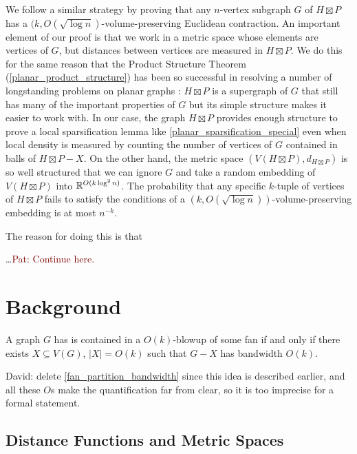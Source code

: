 \documentclass{patmorin}
\newcommand{\david}[1]{{\color{orange} David: #1}}
\newcommand{\pat}[1]{\textcolor{Maroon}{Pat: #1}}
\begin{document}
We follow a similar strategy by proving that any $n$-vertex subgraph $G$ of $H\boxtimes P$ has a $(k,O(\sqrt{\log n})$-volume-preserving Euclidean contraction.  An important element of our proof is that we work in a metric space whose elements are vertices of $G$, but distances between vertices are measured in $H\boxtimes P$.  We do this for the same reason that the Product Structure Theorem (\cref{planar_product_structure}) has been so successful in resolving a number of longstanding problems on planar graphs \cite{dujmovic.joret.ea:planar,EJM23,DEJWW20,DEGJMM21}:  $H\boxtimes P$ is a supergraph of $G$ that still has many of the important properties of $G$ but its simple structure makes it easier to work with.  In our case, the graph $H\boxtimes P$ provides enough structure to prove a local sparsification lemma like \cref{planar_sparsification_special} even when local density is measured by counting the number of vertices of $G$ contained in balls of $H\boxtimes P-X$.  On the other hand, the metric space $(V(H\boxtimes P),d_{H\boxtimes P})$ is so well structured that we can ignore $G$ and take a random embedding of $V(H\boxtimes P)$ into $\mathbb{R}^{O(k\log^2 n)}$.  The probability that any specific $k$-tuple of vertices of $H\boxtimes P$ fails to satisfy the conditions of a $(k,O(\sqrt{\log n}))$-volume-preserving embedding is at most $n^{-k}$.



The reason for doing this is that






\ldots \pat{Continue here.}


\section{Background}



\begin{cor}\label{fan_partition_bandwidth}
  A graph $G$ has is contained in a $O(k)$-blowup of some fan if and only if there exists $X\subseteq V(G)$, $|X|=O(k)$ such that $G-X$ has bandwidth $O(k)$.
\end{cor}

\david{delete \cref{fan_partition_bandwidth} since this idea is described earlier, and all these $O$s make the quantification far from clear, so it is too imprecise for a formal statement.}


\subsection{Distance Functions and Metric Spaces}
\end{document}
